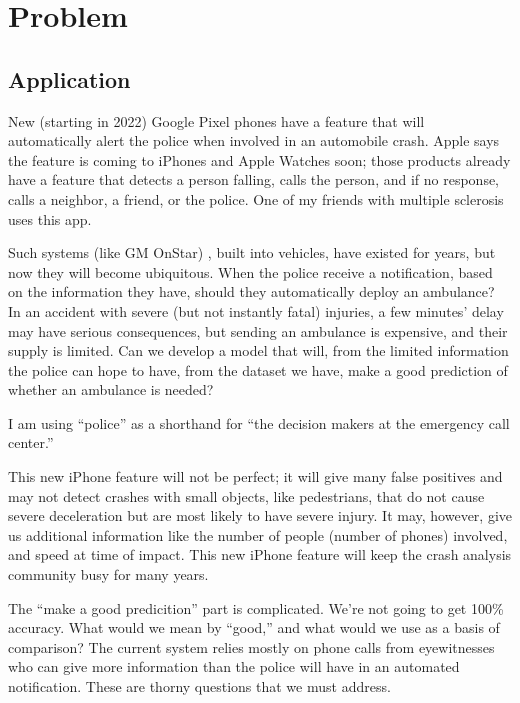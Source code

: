 \section{Problem}

\subsection{Application}


New (starting in 2022) Google Pixel phones have a feature that will automatically alert the police when involved in an automobile crash.  Apple says the feature is coming to iPhones  and Apple Watches soon; those products already have a feature that detects a person falling, calls the person, and if no response, calls a neighbor, a friend, or the police.  One of my friends with multiple sclerosis uses this app.

Such systems (like GM OnStar) , built into vehicles, have existed for years, but now they will become ubiquitous.  When the police receive a notification, based on the information they have, should they automatically deploy an ambulance?  In an accident with severe (but not instantly fatal) injuries, a few minutes' delay may have serious consequences, but sending an ambulance is expensive, and their supply is limited.  Can we develop a model that will, from the limited information the police can hope to have, from the dataset we have, make a good prediction of whether an ambulance is needed?  

I am using ``police'' as a shorthand for ``the decision makers at the emergency call center.''  

This new iPhone feature will not be perfect; it will give many false positives and may not detect crashes with small objects, like pedestrians,  that do not cause severe deceleration but are most likely to have severe injury.  It may, however, give us additional information like the number of people (number of phones) involved, and speed at time of impact.  This new iPhone feature will keep the crash analysis community busy for many years.  

The ``make a good predicition'' part is complicated.  We're not going to get 100\% accuracy.   What would we mean by ``good,'' and what would we use as a basis of comparison?  The current system relies mostly on phone calls from eyewitnesses who can give more information than the police will have in an automated notification.  These are thorny questions that we must address.  

